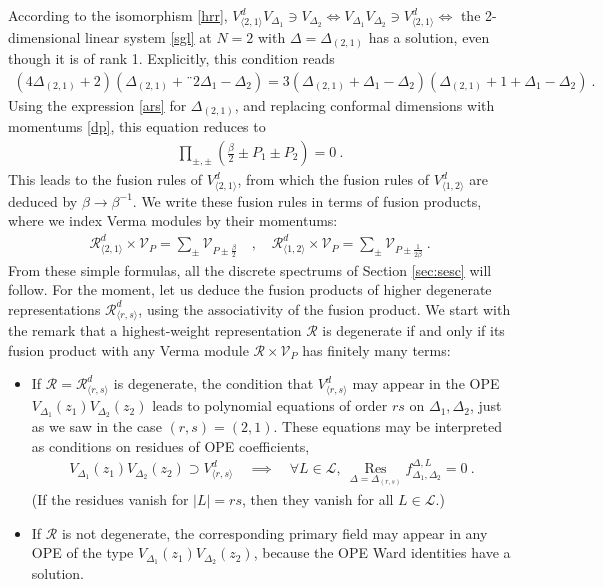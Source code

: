 \documentclass[12pt, a4paper]{article}
\begin{document}
According to the isomorphism \eqref{hrr}, $V^d_{\langle 2,1\rangle} V_{\Delta_1} \ni V_{\Delta_2} \iff V_{\Delta_1}V_{\Delta_2} \ni V^d_{\langle 2,1\rangle} \iff $ the 2-dimensional linear system \eqref{sgl} at $N=2$ with $\Delta=\Delta_{(2,1)}$ has a solution, even though it is of rank 1. Explicitly, this condition reads
\begin{align}
 \left(4\Delta_{(2,1)}+2\right) \left(\Delta_{(2,1)}+¨2\Delta_1-\Delta_2\right) = 3\left(\Delta_{(2,1)}+\Delta_1-\Delta_2\right)\left(\Delta_{(2,1)}+1+\Delta_1-\Delta_2\right)\ .
\end{align}
Using the expression \eqref{ars} for $\Delta_{(2,1)}$, and replacing conformal dimensions with momentums \eqref{dp}, this equation reduces to 
\begin{align}
 \prod_{\pm,\pm}\left(\tfrac{\beta}{2}\pm P_1\pm P_2\right) = 0\ . 
\end{align}
This leads to the fusion rules of $V^d_{\langle 2,1\rangle}$, from which the fusion rules of $V^d_{\langle 1,2\rangle}$ are deduced by $\beta\to \beta^{-1}$. We write these fusion rules in terms of fusion products, where we index Verma modules by their momentums:
\begin{align}
 \boxed{\mathcal{R}^d_{\langle 2,1\rangle}\times \mathcal{V}_P = \sum_\pm \mathcal{V}_{P\pm \frac{\beta}{2}}} \quad, \quad \boxed{\mathcal{R}^d_{\langle 1,2\rangle}\times \mathcal{V}_P = \sum_\pm \mathcal{V}_{P\pm \frac{1}{2\beta}}}\ . 
 \label{rvvp}
\end{align}
From these simple formulas, all the discrete spectrums of Section \ref{sec:sesc} will follow. For the moment, let us deduce the fusion products of higher degenerate representations $\mathcal{R}^d_{\langle r,s\rangle}$, using the associativity of the fusion product. We start with the remark that a highest-weight representation $\mathcal{R}$ is degenerate if and only if its fusion product with any Verma module $\mathcal{R}\times \mathcal{V}_P$ has finitely many terms:
\begin{itemize}
 \item If $\mathcal{R}=\mathcal{R}^d_{\langle r,s\rangle}$ is degenerate, the condition that $V^d_{\langle r,s\rangle}$ may appear in the OPE $V_{\Delta_1}(z_1)V_{\Delta_2}(z_2)$ leads to polynomial equations of order $rs$ on $\Delta_1,\Delta_2$, just as we saw in the case $(r,s)=(2,1)$. These equations may be interpreted as conditions on residues of OPE coefficients,
 \begin{align}
  V_{\Delta_1}(z_1)V_{\Delta_2}(z_2) \supset V^d_{\langle r,s\rangle} \quad \implies \quad \forall L\in \mathcal{L},\ \underset{\Delta=\Delta_{(r,s)}}{\operatorname{Res}} f^{\Delta,L}_{\Delta_1,\Delta_2} = 0\ .
 \end{align}
 (If the residues vanish for $|L|=rs$, then they vanish for all $L\in\mathcal{L}$.)
 \item If $\mathcal{R}$ is not degenerate, the corresponding primary field may appear in any OPE of the type $V_{\Delta_1}(z_1)V_{\Delta_2}(z_2)$, because the OPE Ward identities have a solution. 
\end{itemize}
\end{document}

